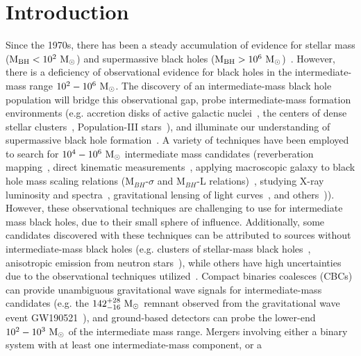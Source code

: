 \documentclass[%
 nofootinbib,
 amsmath,amssymb,
 aps,
 twocolumn,
 superscriptaddress
]{revtex4-2}
\newcommand{\mathcmd}[1]{{\sc \relax\ifmmode#1\else $#1$\fi}\xspace}
\newcommand{\msun}{\mathcmd{\text{M}_\odot}}
\begin{document}
\section{Introduction}
Since the 1970s, there has been a steady accumulation of evidence for stellar mass ($\text{M}_\text{BH} < 10^{2} \ \msun$) and supermassive black holes ($\text{M}_\text{BH} > 10^{6} \ \msun$)~\cite{Webster:1972:Natur, Balick:1974:ApJ, Ghez:1998:ApJ, Genzel:2010:RvMP, Abbott:2019:PhRvX, EventHorizonTelescopeCollaboration:2019:ApJL, Abbott:2020:arXiv}.  However, there is a deficiency of observational evidence for black holes in the intermediate-mass range $10^{2} - 10^{6}\ \msun$. The discovery of an intermediate-mass black hole population will bridge this observational gap, probe intermediate-mass formation environments (e.g. accretion disks of active galactic nuclei~\cite{Tagawa:2021:ApJ, Li:2021:arXiv, Samsing:2020:arXiv, Tagawa:2020:ApJ, Ishibashi:2020:A&A, Grobner:2020:A&A, Yang:2019:PhRvL, McKernan:2019:ApJL, Yang:2019:ApJ, McKernan:2018:ApJ, Bellovary:2016:ApJL, McKernan:2014:MNRAS, McKernan:2012:MNRAS}, the centers of dense stellar clusters~\cite{Banerjee:2021:MNRASa, Zevin:2021:ApJ,Mapelli:2021:arXiv,Weatherford:2021:ApJL, Bouffanais:2021:arXiv, Ballone:2021:MNRAS, Kumamoto:2021:arXiv, Banerjee:2021:MNRASb, Martinez:2020:ApJ, Romero-Shaw:2020:ApJL, Anagnostou:2020:PASA}, Population-III stars~\cite{Toubiana:2021:PhRvL, Farrell:2021:MNRAS, Safarzadeh:2020:ApJL, Liu:2020:MNRAS, Inayoshi:2017:MNRAS}), and illuminate our understanding of supermassive black hole formation~\cite{Askar:2021:MNRAS, ArcaSedda:2019:arXiv, Amaro-Seoane:2007:CQGra, Gurkan:2006:ApJL}. A variety of techniques have been employed to search for $10^{4} - 10^{6}\ \msun$ intermediate mass candidates (reverberation mapping~\cite{Peterson:2014:SSRv}, direct kinematic measurements~\cite{Schodel:2002:Natur, Kiziltan:2017:Natur}, applying macroscopic galaxy to black hole mass scaling relations (M$_{BH}$-$\sigma$ and M$_{BH}$-L relations)~\cite{Graham:2013:ApJ, Wevers:2017:MNRAS}, studying  X-ray luminosity and spectra~\cite{Greene:2004:ApJ, Lin:2020:ApJL}, gravitational lensing of light curves~\cite{paynter_evidence_2021}, and others~\cite{Greene:2020:ARA&A, Koliopanos:2017:mbhe, Mezcua:2017:IJMPD})). However, these observational techniques are challenging to use for intermediate mass black holes, due to their small sphere of influence. Additionally, some candidates discovered with these techniques can be attributed to sources without intermediate-mass black holes (e.g. clusters of stellar-mass black holes~\cite{Ridolfi:2016:MNRAS, Freire:2017:MNRAS}, anisotropic emission from neutron stars~\cite{Israel:2017:MNRAS, RodriguezCastillo:2020:ApJ}), while others have high uncertainties due to the observational techniques utilized~\cite{Greene:2020:ARA&A}. Compact binaries coalesces (CBCs) can provide unambiguous gravitational wave signals for intermediate-mass candidates (e.g. the $142^{+28}_{-16}\ \msun$ remnant observed from the gravitational wave event GW190521~\cite{Abbott:2020:PhRvL}), and ground-based detectors can probe the lower-end $10^{2} - 10^{3}\ \msun$ of the intermediate mass range. Mergers involving either a binary system with at least one intermediate-mass component, or a 
\end{document}
